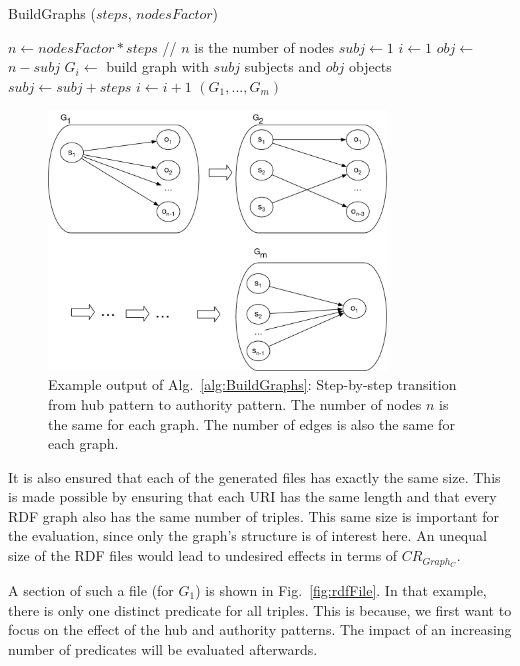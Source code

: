 \begin{algorithm}
	\caption{BuildGraphs ($steps$, $ nodesFactor$)}\label{alg:BuildGraphs}
	\begin{algorithmic}[1]
	\State $n \leftarrow nodesFactor*steps$ // $n$ is the number of nodes
	\State $subj \leftarrow 1$
	\State $i \leftarrow 1$
		\State $obj \leftarrow$ $n-subj$ 
		\State $G_i \leftarrow$ build graph with $subj$ subjects and $obj$ objects\label{line:buildgraph}
		\State  $subj\leftarrow subj+steps$
		\State  $i\leftarrow i+1$
	\EndWhile
	\State \Return $(G_1,...,G_m)$
	\end{algorithmic}
\end{algorithm}

\begin{figure}[h]
	\centering
	\includegraphics[width=0.8\textwidth]{figures/GRPvsHDT/starpattern.pdf}
	\caption{Example output of Alg.~\ref{alg:BuildGraphs}: Step-by-step transition from hub pattern to authority pattern. The number of nodes $n$ is the same for each graph. The number of edges is also the same for each graph.}
	\label{fig:star_pattern}
\end{figure}

It is also ensured that each of the generated files has exactly the same size. This is made possible by ensuring that each URI has the same length and that every RDF graph also has the same number of triples. This same size is important for the evaluation, since only the graph's structure is of interest here. An unequal size of the RDF files would lead to undesired effects in terms of $CR_{Graph_C}$.

A section of such a file (for $G_1$) is shown in Fig.~\ref{fig:rdfFile}. In that example, there is only one distinct predicate for all triples. This is because, we first want to focus on the effect of the hub and authority patterns. The impact of an increasing number of predicates will be evaluated afterwards.



